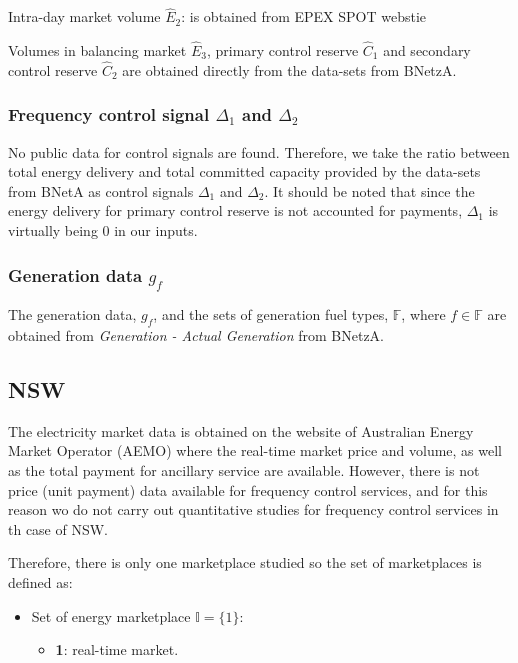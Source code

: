 Intra-day market volume $\hat{E}_2$: is obtained from EPEX SPOT webstie

Volumes in balancing market  $\hat{E}_3$, primary control reserve $\hat{C}_1$ and secondary control reserve $\hat{C}_2$ are obtained directly from the data-sets from BNetzA.

\subsubsection{Frequency control signal $\Delta_1$ and $\Delta_2$}

No public data for control signals are found. Therefore, we take the ratio between total energy delivery and total committed capacity provided by the data-sets from BNetA as control signals $\Delta_1$ and $\Delta_2$. It should be noted that since the energy delivery for primary control reserve is not accounted for payments, $\Delta_1$ is virtually being 0 in our inputs.

\subsubsection{Generation data $g_{f}$}

The generation data, $g_{f}$, and the sets of generation fuel types, $\mathbb{F}$, where $f \in \mathbb{F}$ are obtained from \textit{Generation - Actual Generation} from BNetzA.

\subsection*{NSW}

The electricity market data is obtained on the website of Australian Energy Market Operator (AEMO) where the real-time market price and volume, as well as the total payment for ancillary service are available. However, there is not price (unit payment) data available for frequency control services, and for this reason wo do not carry out quantitative studies for frequency control services in th case of NSW. 

Therefore, there is only one marketplace studied so the set of marketplaces is defined as:

\begin{itemize}
	\item Set of energy marketplace $\mathbb{I} = \{1\}$:
	\begin{itemize}
		\item \textbf{1}: real-time market.
	\end{itemize}
\end{itemize}

